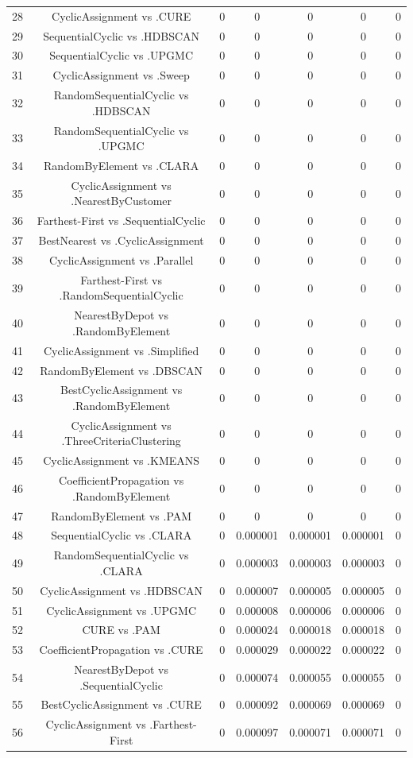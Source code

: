 \documentclass[a4paper,10pt]{article}
\begin{document}
\begin{landscape}
\begin{table}[!htp]
\begin{tabular}{ccccccc}
28&CyclicAssignment vs .CURE&0&0&0&0&0\\
29&SequentialCyclic vs .HDBSCAN&0&0&0&0&0\\
30&SequentialCyclic vs .UPGMC&0&0&0&0&0\\
31&CyclicAssignment vs .Sweep&0&0&0&0&0\\
32&RandomSequentialCyclic vs .HDBSCAN&0&0&0&0&0\\
33&RandomSequentialCyclic vs .UPGMC&0&0&0&0&0\\
34&RandomByElement vs .CLARA&0&0&0&0&0\\
35&CyclicAssignment vs .NearestByCustomer&0&0&0&0&0\\
36&Farthest-First vs .SequentialCyclic&0&0&0&0&0\\
37&BestNearest vs .CyclicAssignment&0&0&0&0&0\\
38&CyclicAssignment vs .Parallel&0&0&0&0&0\\
39&Farthest-First vs .RandomSequentialCyclic&0&0&0&0&0\\
40&NearestByDepot vs .RandomByElement&0&0&0&0&0\\
41&CyclicAssignment vs .Simplified&0&0&0&0&0\\
42&RandomByElement vs .DBSCAN&0&0&0&0&0\\
43&BestCyclicAssignment vs .RandomByElement&0&0&0&0&0\\
44&CyclicAssignment vs .ThreeCriteriaClustering&0&0&0&0&0\\
45&CyclicAssignment vs .KMEANS&0&0&0&0&0\\
46&CoefficientPropagation vs .RandomByElement&0&0&0&0&0\\
47&RandomByElement vs .PAM&0&0&0&0&0\\
48&SequentialCyclic vs .CLARA&0&0.000001&0.000001&0.000001&0\\
49&RandomSequentialCyclic vs .CLARA&0&0.000003&0.000003&0.000003&0\\
50&CyclicAssignment vs .HDBSCAN&0&0.000007&0.000005&0.000005&0\\
51&CyclicAssignment vs .UPGMC&0&0.000008&0.000006&0.000006&0\\
52&CURE vs .PAM&0&0.000024&0.000018&0.000018&0\\
53&CoefficientPropagation vs .CURE&0&0.000029&0.000022&0.000022&0\\
54&NearestByDepot vs .SequentialCyclic&0&0.000074&0.000055&0.000055&0\\
55&BestCyclicAssignment vs .CURE&0&0.000092&0.000069&0.000069&0\\
56&CyclicAssignment vs .Farthest-First&0&0.000097&0.000071&0.000071&0\\

\end{tabular}
\end{table}
\end{landscape}
\end{document}
